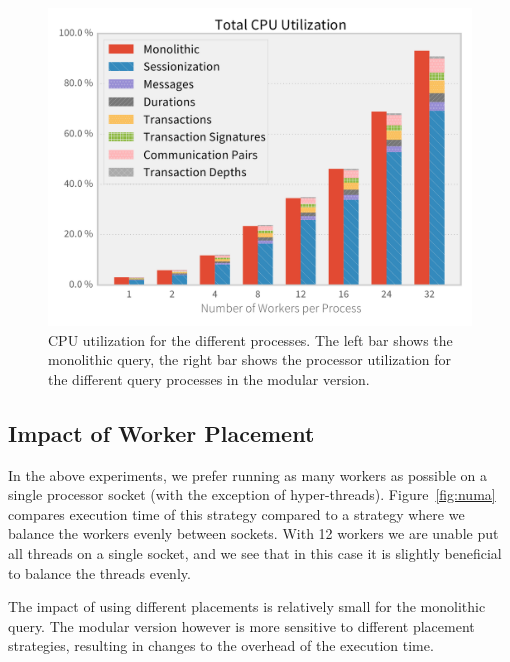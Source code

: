 \begin{figure}[p]
  \centering
    \includegraphics[width=1\textwidth]{figures/evaluation/cpu_tot}
    \caption[Total CPU utilization]{CPU utilization for the different
    processes. The left bar shows the monolithic query, the right bar shows the
    processor utilization for the different query processes in the modular version.}
    \label{fig:cpu}
\end{figure}
\clearpage
\subsection{Impact of Worker Placement} \label{sec:evalnuma}

In the above experiments, we prefer running as many workers as possible
on a single processor socket (with the exception of hyper-threads).
Figure~\ref{fig:numa} compares execution time of this strategy compared to a
strategy where we balance the workers evenly between sockets. With 12 workers
we are unable put all threads on a single socket, and we see that in this case
it is slightly beneficial to balance the threads evenly.

The impact of using different placements is relatively small for the
monolithic query. The modular version however is more sensitive to
different placement strategies, resulting in changes to the overhead
of the execution time. 

